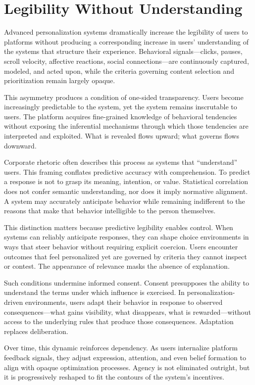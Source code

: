 \documentclass[12pt]{article}
\begin{document}
\section{Legibility Without Understanding}

Advanced personalization systems dramatically increase the legibility of users to platforms without producing a corresponding increase in users' understanding of the systems that structure their experience. Behavioral signals—clicks, pauses, scroll velocity, affective reactions, social connections—are continuously captured, modeled, and acted upon, while the criteria governing content selection and prioritization remain largely opaque.

This asymmetry produces a condition of one-sided transparency. Users become increasingly predictable to the system, yet the system remains inscrutable to users. The platform acquires fine-grained knowledge of behavioral tendencies without exposing the inferential mechanisms through which those tendencies are interpreted and exploited. What is revealed flows upward; what governs flows downward.

Corporate rhetoric often describes this process as systems that ``understand'' users. This framing conflates predictive accuracy with comprehension. To predict a response is not to grasp its meaning, intention, or value. Statistical correlation does not confer semantic understanding, nor does it imply normative alignment. A system may accurately anticipate behavior while remaining indifferent to the reasons that make that behavior intelligible to the person themselves.

This distinction matters because predictive legibility enables control. When systems can reliably anticipate responses, they can shape choice environments in ways that steer behavior without requiring explicit coercion. Users encounter outcomes that feel personalized yet are governed by criteria they cannot inspect or contest. The appearance of relevance masks the absence of explanation.

Such conditions undermine informed consent. Consent presupposes the ability to understand the terms under which influence is exercised. In personalization-driven environments, users adapt their behavior in response to observed consequences—what gains visibility, what disappears, what is rewarded—without access to the underlying rules that produce those consequences. Adaptation replaces deliberation.

Over time, this dynamic reinforces dependency. As users internalize platform feedback signals, they adjust expression, attention, and even belief formation to align with opaque optimization processes. Agency is not eliminated outright, but it is progressively reshaped to fit the contours of the system’s incentives.
\end{document}
